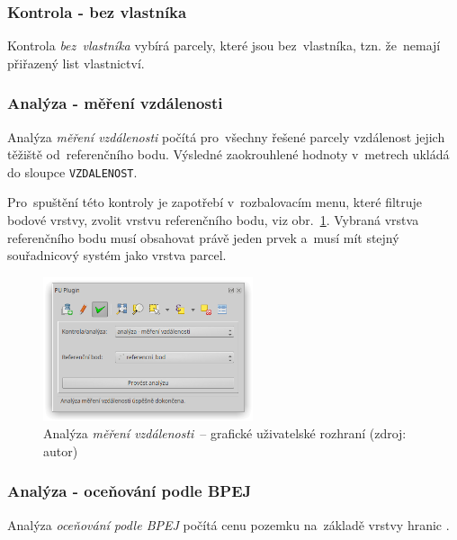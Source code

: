 \subsubsection{Kontrola - bez vlastníka}
\label{manual_kontrola_bez_vlastnika}

Kontrola \textit{bez~vlastníka} vybírá parcely, které jsou
bez~vlastníka, tzn. že~nemají přiřazený list vlastnictví.

\subsubsection{Analýza - měření vzdálenosti}
\label{manual_analyza_vzdalenosti}

Analýza \textit{měření vzdálenosti} počítá pro~všechny řešené parcely
vzdálenost jejich těžiště od~referenčního bodu. Výsledné zaokrouhlené
hodnoty v~metrech ukládá do sloupce \texttt{VZDALENOST}.

Pro~spuštění této kontroly je zapotřebí v~rozbalovacím menu, které
filtruje bodové vrstvy, zvolit vrstvu referenčního bodu, viz
obr.~\ref{fig:manual_analyza_vzdalenosti_gui}. Vybraná vrstva
referenčního bodu musí obsahovat právě jeden prvek a~musí mít stejný
souřadnicový systém jako vrstva parcel.

	\begin{figure}[H] \centering
		\includegraphics[width=0.55\textwidth]{./pictures/analyza_vzdalenost.png}
		\caption[Analýza \textit{měření vzdálenosti}~–
grafické uživatelské rozhraní]{Analýza \textit{měření vzdálenosti}~–
grafické uživatelské rozhraní (zdroj: autor)}
		\label{fig:manual_analyza_vzdalenosti_gui}
 	\end{figure}

\subsubsection{Analýza - oceňování podle BPEJ}
\label{manual_analyza_bpej}

Analýza \textit{oceňování podle BPEJ} počítá cenu pozemku na~základě
vrstvy hranic .


